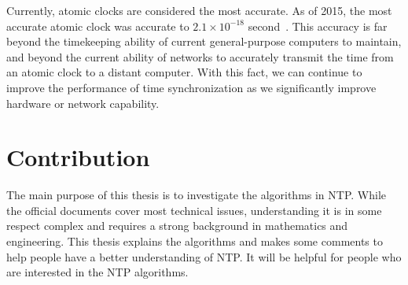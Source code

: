 Currently, atomic clocks are considered the most accurate. As of 2015, the most
accurate atomic clock was accurate to $2.1\times 10^{-18}$
second~\cite{atomic_clock}.
This accuracy is far beyond the timekeeping ability of current general-purpose
computers to maintain, and beyond the current ability of networks to accurately
transmit the time from an atomic clock to a distant computer. With this fact,
we can continue to improve the performance of time synchronization as we
significantly improve hardware or network capability.

\section{Contribution}
\label{sec:contribution}
The main purpose of this thesis is to investigate the algorithms in NTP\null.
While the official documents cover most technical issues, understanding it is
in some respect complex and requires a strong background in mathematics and
engineering. This thesis explains the algorithms and makes some comments to
help people have a better understanding of NTP\null.  It will be helpful for
people who are interested in the NTP algorithms.

